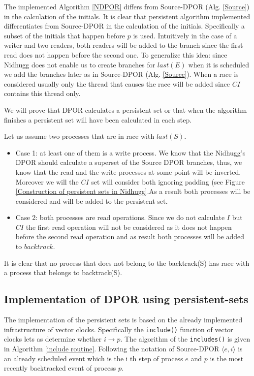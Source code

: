 The implemented Algorithm \ref{NDPOR} differs from Source-DPOR (Alg. \ref{Source}) in the calculation of the initials.
It is clear that persistent algorithm implemented differentiates from Source-DPOR in the calculation of the initials. 
Specifically a subset of the initials that happen before $p$ is used. 
Intuitively in the case of a writer and two readers, both readers will be added to the branch since the first read does not
happen before the second one.
To generalize this idea: since Nidhugg does not enable us to create branches for $last(E)$ when it is scheduled we add the 
branches later as in Source-DPOR (Alg. \ref{Source}). When a race is considered usually only the thread that causes the race will be added since 
$CI$ contains this thread only.

We will prove that DPOR calculates a persistent set or that when the algorithm finishes a persistent set will have been calculated in each step.

Let us assume two processes that are in race with $last(S)$.
\begin{itemize}

\item Case 1: at least one of them is a write process.
We know that the Nidhugg's DPOR should calculate a superset of the Source DPOR branches, thus, we know that the read and the write processes at some point
will be inverted. Moreover we will the $CI$ set will consider both ignoring padding (see Figure \ref{Construction of persistent sets in Nidhugg}.As a result both processes will be considered and will be added to the persistent set.


\item Case 2: both processes are read operations.
Since we do not calculate $I$ but $CI$ the first read operation will not be considered as it does not happen before the second read operation and as result
both processes will be added to $backtrack$. 

\end{itemize}
It is clear that no process that does not belong to the backtrack(S) has race with a process that belongs to backtrack(S).

\subsection{Implementation of DPOR using persistent-sets}

The implementation of the persistent sets is based on the already implemented infrastructure of vector clocks. Specifically the \verb|include()| function of vector clocks
lets as determine whether $i \rightarrow p$. The algorithm of the \verb|includes()| is given in Algorithm \ref{include routine}. Following the notation
of Source-DPOR $\langle e, i \rangle$ is an already scheduled event which is the i th step of process $e$  and $p$ is the most recently backtracked event of process $p$. 


